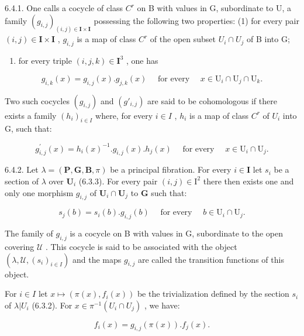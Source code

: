 6.4.1. One calls a cocycle of class \(C^{r}\) on B with values in G, subordinate to U, a family \((g_{i,j})_{(i,j)\in\mathbf{I}\times\mathbf{I}}\) possessing the following two properties: (1) for every pair \((i,j)\in\mathbf{I}\times\mathbf{I}\) , \(g_{i,j}\) is a map of class \(C^{r}\) of the open subset \(U_{i}\cap U_{j}\) of B into G;

\begin{enumerate}
\def\labelenumi{(\arabic{enumi})}
\setcounter{enumi}{1}
\tightlist
\item
  for every triple \((i,j,k)\in \mathbf{I}^3\) , one has
\end{enumerate}

\[
g _ {i, k} (x) = g _ {i, j} (x). g _ {j, k} (x) \quad \text { for   every } \quad x \in \mathrm{U} _ {i} \cap \mathrm{U} _ {j} \cap \mathrm{U} _ {k}.
\]

Two such cocycles \((g_{i,j})\) and \((g'_{i,j})\) are said to be cohomologous if there exists a family \((h_{i})_{i\in I}\) where, for every \(i\in I\) , \(h_{i}\) is a map of class \(C^{r}\) of \(U_{i}\) into G, such that:

\[
g _ {i, j} ^ {\prime} (x) = h _ {i} (x) ^ {- 1}. g _ {i, j} (x). h _ {j} (x) \quad \text { for   every } \quad x \in \mathrm{U} _ {i} \cap \mathrm{U} _ {j}.\tag{3}
\]

6.4.2. Let \(\lambda = (\mathbf{P},\mathbf{G},\mathbf{B},\pi)\) be a principal fibration. For every \(i\in \mathbf{I}\) let \(s_i\) be a section of \(\lambda\) over \(\mathbf{U}_i\) (6.3.3). For every pair \((i,j)\in \mathrm{I}^2\) there then exists one and only one morphism \(g_{i,j}\) of \(\mathbf{U}_i\cap \mathbf{U}_j\) to \(\mathbf{G}\) such that:

\[
s _ {j} (b) = s _ {i} (b). g _ {i, j} (b) \quad \text { for   every } \quad b \in \mathrm{U} _ {i} \cap \mathrm{U} _ {j}.\tag{4}
\]

The family of \(g_{i,j}\) is a cocycle on B with values in G, subordinate to the open covering \(\mathcal{U}\) . This cocycle is said to be associated with the object \((\lambda, \mathcal{U}, (s_i)_{i \in I})\) and the maps \(g_{i,j}\) are called the transition functions of this object.

For \(i \in I\) let \(x \mapsto (\pi(x), f_i(x))\) be the trivialization defined by the section \(s_i\) of \(\lambda |U_i\) (6.3.2). For \(x \in \pi^{-1}(U_i \cap U_j)\) , we have:

\[
f _ {i} (x) = g _ {i, j} (\pi (x)). f _ {j} (x).\tag{5}
\]

